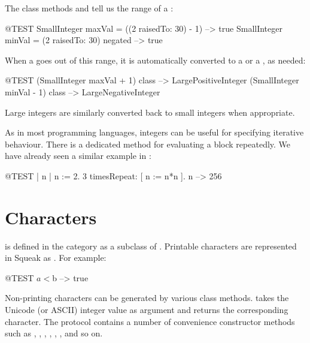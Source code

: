\documentclass[a4paper,10pt,twoside]{book}
\begin{document}
The class methods  and  tell us the range of a :

\begin{code}{@TEST}
SmallInteger maxVal = ((2 raisedTo: 30) - 1)      --> true
SmallInteger minVal = (2 raisedTo: 30) negated --> true
\end{code}

When a  goes out of this range, it is automatically converted to a  or a , as needed:

\begin{code}{@TEST}
(SmallInteger maxVal + 1) class --> LargePositiveInteger
(SmallInteger minVal - 1) class  --> LargeNegativeInteger
\end{code}

Large integers are similarly converted back to small integers when appropriate.

As in most programming languages, integers can be useful for specifying iterative behaviour.  There is a dedicated method  for evaluating a block repeatedly.
We have already seen a similar example in :
\begin{code}{@TEST | n |}
n := 2.
3 timesRepeat: [ n := n*n ].
n --> 256
\end{code}

\section{Characters}

 is defined in the  category as a subclass of . Printable characters are represented in Squeak as .  For example:

\begin{code}{@TEST}
$a < $b --> true
\end{code}

Non-printing characters can be generated by various class methods.  \mbox{} takes the Unicode (or ASCII) integer value as argument and returns the corresponding character. The protocol  contains a number of convenience constructor methods such as , , , , , , and so on.
\end{document}
